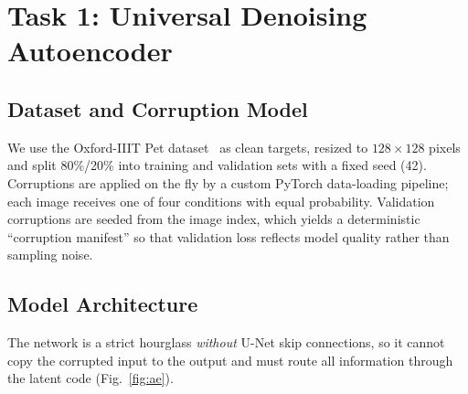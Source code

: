 \documentclass[conference]{IEEEtran}
\begin{document}
\section{Task 1: Universal Denoising Autoencoder}\label{sec:t1}

\subsection{Dataset and Corruption Model}
We use the Oxford-IIIT Pet dataset~\cite{parkhi2012cats} as clean targets, resized to $128\times128$ pixels and split 80\%/20\% into training and validation sets with a fixed seed (42). Corruptions are applied on the fly by a custom PyTorch data-loading pipeline; each image receives one of four conditions with equal probability. Validation corruptions are seeded from the image index, which yields a deterministic ``corruption manifest'' so that validation loss reflects model quality rather than sampling noise.

\subsection{Model Architecture}
The network is a strict hourglass \emph{without} U-Net skip connections, so it cannot copy the corrupted input to the output and must route all information through the latent code (Fig.~\ref{fig:ae}). 
\end{document}
